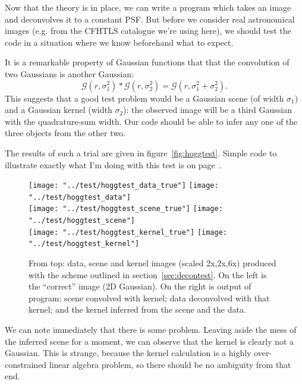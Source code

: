 \documentclass[letterpaper, 11pt]{article}
\begin{document}
Now that the theory is in place, we can write a program which takes an image and deconvolves it to a constant PSF. But before we consider real astronomical images (e.g. from the CFHTLS catalogue we're using here), we should test the code in a situation where we know beforehand what to expect.

It is a remarkable property of Gaussian functions that that the convolution of two Gaussians is another Gaussian:
\begin{equation}
	\mathcal{G}(r,\sigma_1^2) \ast \mathcal{G}(r,\sigma_2^2) = \mathcal{G}(r, \sigma_1^2+\sigma_2^2).
\end{equation}
This suggests that a good test problem would be a Gaussian scene (of width $\sigma_1$) and a Gaussian kernel (width $\sigma_2$): the observed image will be a third Gaussian with the quadrature-sum width. Our code should be able to infer any one of the three objects from the other two.

The results of such a trial are given in figure~\vref{fig:hoggtest}. Simple code to illustrate exactly what I'm doing with this test is on page~\pageref{cde:hoggtest}.

\begin{figure}[h]
 	\def\width{0.2\linewidth}
 	\def\scale{2}
 	\centering
 	\texttt{[image: "../test/hoggtest\_data\_true"]}
 	\texttt{[image: "../test/hoggtest\_data"]}\\ \vspace{1mm}
 	\texttt{[image: "../test/hoggtest\_scene\_true"]}
 	\texttt{[image: "../test/hoggtest\_scene"]}\\ \vspace{1mm}
 	\texttt{[image: "../test/hoggtest\_kernel\_true"]}
 	\texttt{[image: "../test/hoggtest\_kernel"]}
 	\caption{From top: data, scene and kernel images (scaled 2x,2x,6x) produced with the scheme outlined in section~\ref{sec:decontest}. On the left is the ``correct'' image (2D Gaussian). On the right is output of program: scene convolved with kernel; data deconvolved with that kernel; and the kernel inferred from the scene and the data.}
 	\label{fig:hoggtest}
\end{figure}

We can note immediately that there is some problem. Leaving aside the mess of the inferred scene for a moment, we can observe that the kernel is clearly not a Gaussian. This is strange, because the kernel calculation is a highly over-constrained linear algebra problem, so there should be no ambiguity from that end.
\end{document}

